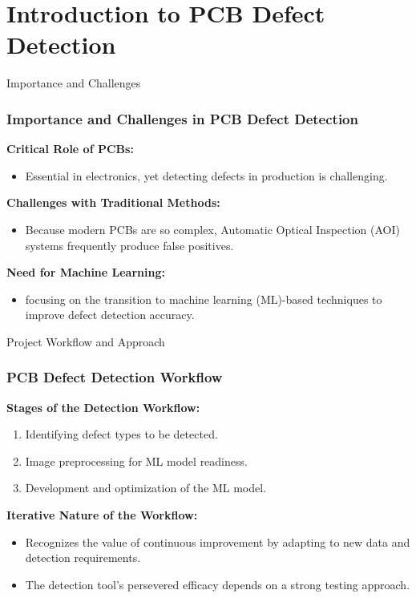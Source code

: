 \section{Introduction to PCB Defect Detection}
\label{intro_section}


\begin{frame}{Importance and Challenges}
    \frametitle{Importance and Challenges in PCB Defect Detection}

    \textbf{Critical Role of PCBs:}
    \begin{itemize}
        \item Essential in electronics, yet detecting defects in production is challenging.
    \end{itemize}

    \textbf{Challenges with Traditional Methods:}
    \begin{itemize}
        \item Because modern PCBs are so complex, Automatic Optical Inspection (AOI) systems frequently produce false positives.
    \end{itemize}
    
    \textbf{Need for Machine Learning:}
    \begin{itemize}
        \item focusing on the transition to machine learning (ML)-based techniques to improve defect detection accuracy.
    \end{itemize}
\end{frame}

\begin{frame}{Project Workflow and Approach}
    \frametitle{PCB Defect Detection Workflow}

    \textbf{Stages of the Detection Workflow:}
    \begin{enumerate}
        \item Identifying defect types to be detected.
        \item Image preprocessing for ML model readiness.
        \item Development and optimization of the ML model.
    \end{enumerate}

    \textbf{Iterative Nature of the Workflow:}
    \begin{itemize}
        \item Recognizes the value of continuous improvement by adapting to new data and detection requirements.
        \item The detection tool's persevered efficacy depends on a strong testing approach.
    \end{itemize}
    
\end{frame}

